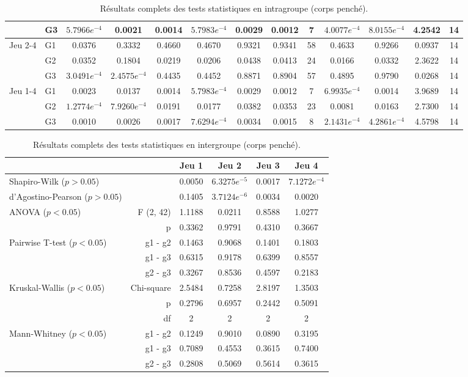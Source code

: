 {\begin{landscape}
\begin{table}[H]
\begin{tabular}{ll|cc|ccccc|cccc}
 & G3 & $5.7966e^{-4}$ & 0.0021 & 0.0014 & $5.7983e^{-4}$ & 0.0029 & 0.0012 & 7 & $4.0077e^{-4}$ & $8.0155e^{-4}$ & 4.2542 & 14 \\\hline
\multirow{3}{*}{Jeu 2-4} & G1 & 0.0376 & 0.3332 & 0.4660 & 0.4670 & 0.9321 & 0.9341 & 58 & 0.4633 & 0.9266 & 0.0937 & 14 \\
 & G2 & 0.0352 & 0.1804 & 0.0219 & 0.0206 & 0.0438 & 0.0413 & 24 & 0.0166 & 0.0332 & 2.3622 & 14 \\
 & G3 & $3.0491e^{-4}$ & $2.4575e^{-4}$ & 0.4435 & 0.4452 & 0.8871 & 0.8904 & 57 & 0.4895 & 0.9790 & 0.0268 & 14 \\\hline
\multirow{3}{*}{Jeu 1-4} & G1 & 0.0023 & 0.0137 & 0.0014 & $5.7983e^{-4}$ & 0.0029 & 0.0012 & 7 & $6.9935e^{-4}$ & 0.0014 & 3.9689 & 14 \\
 & G2 & $1.2774e^{-4}$ & $7.9260e^{-4}$ & 0.0191 & 0.0177 & 0.0382 & 0.0353 & 23 & 0.0081 & 0.0163 & 2.7300 & 14 \\
 & G3 & 0.0010 & 0.0026 & 0.0017 & $7.6294e^{-4}$ & 0.0034 & 0.0015 & 8 & $2.1431e^{-4}$ & $4.2861e^{-4}$ & 4.5798 & 14
\end{tabular}
\caption{Résultats complets des tests statistiques en intragroupe (corps penché).}
\end{table}
\end{landscape}}

\begin{table}[H]
\begin{tabular}{lr|cccc}
 &  & Jeu 1 & Jeu 2 & Jeu 3 & Jeu 4 \\\hline
Shapiro-Wilk ($p > 0.05$) &  & 0.0050 & $6.3275e^{-5}$ & 0.0017 & $7.1272e^{-4}$ \\
d'Agostino-Pearson ($p > 0.05$) &  & 0.1405 & $3.7124e^{-6}$ & 0.0034 & 0.0020 \\\hline
\multirow{2}{*}{ANOVA ($p < 0.05$)} & F (2, 42) & 1.1188 & 0.0211 & 0.8588 & 1.0277 \\
 & p & 0.3362 & 0.9791 & 0.4310 & 0.3667 \\\hline
\multirow{3}{*}{Pairwise T-test ($p < 0.05$)} & g1 - g2 & 0.1463 & 0.9068 & 0.1401 & 0.1803 \\
 & g1 - g3 & 0.6315 & 0.9178 & 0.6399 & 0.8557 \\
 & g2 - g3 & 0.3267 & 0.8536 & 0.4597 & 0.2183 \\\hline
\multirow{3}{*}{Kruskal-Wallis ($p < 0.05$)} & Chi-square & 2.5484 & 0.7258 & 2.8197 & 1.3503 \\
 & p & 0.2796 & 0.6957 & 0.2442 & 0.5091 \\
 & df & 2 & 2 & 2 & 2 \\\hline
\multirow{3}{*}{Mann-Whitney ($p < 0.05$)} & g1 - g2 & 0.1249 & 0.9010 & 0.0890 & 0.3195 \\
 & g1 - g3 & 0.7089 & 0.4553 & 0.3615 & 0.7400 \\
 & g2 - g3 & 0.2808 & 0.5069 & 0.5614 & 0.3615
\end{tabular}
\caption{Résultats complets des tests statistiques en intergroupe (corps penché).}
\end{table}

